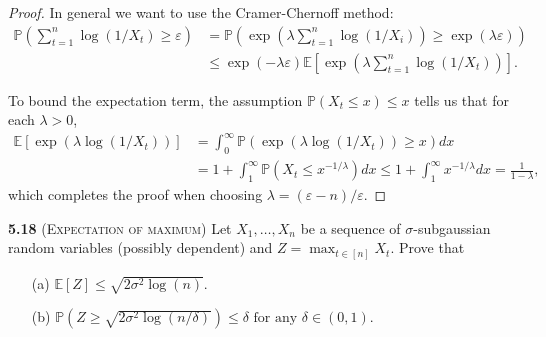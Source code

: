 \begin{proof}
	In general we want to use the Cramer-Chernoff method:
	\begin{equation*}
		\begin{aligned}
			\mathbb{P}\left(\sum_{t=1}^{n} \log \left(1 / X_{t}\right) \geq \varepsilon\right)
			&=\mathbb{P}\left(\exp \left(\lambda \sum_{t=1}^{n} \log \left(1 / X_{i}\right)\right) \geq \exp (\lambda \varepsilon)\right)\\
			&\leq \exp (-\lambda \varepsilon) \mathbb{E}\left[\exp \left(\lambda \sum_{t=1}^{n} \log \left(1 / X_{t}\right)\right)\right].
		\end{aligned}
	\end{equation*}

	To bound the expectation term, the assumption $\mathbb{P}\left(X_{t} \leq x\right) \leq x$ tells us that for each $\lambda > 0$,
	\begin{equation*}
		\begin{aligned}
			\mathbb{E}\left[\exp \left(\lambda \log \left(1 / X_{t}\right)\right)\right]
			&=\int_{0}^{\infty} \mathbb{P}\left(\exp \left(\lambda \log \left(1 / X_{t}\right)\right) \geq x\right) d x\\
			&=1+\int_{1}^{\infty} \mathbb{P}\left(X_{t} \leq x^{-1 / \lambda}\right) d x \leq 1+\int_{1}^{\infty} x^{-1 / \lambda} d x=\frac{1}{1-\lambda},
		\end{aligned}
	\end{equation*}
	which completes the proof when choosing $\lambda=(\varepsilon-n) / \varepsilon$.
\end{proof}








\noindent \textbf{5.18} (\textsc{Expectation of maximum})
Let $X_{1}, \ldots, X_{n}$ be a sequence of $\sigma$-subgaussian random variables
(possibly dependent) and $Z=\max _{t \in[n]} X_{t}$. Prove that

\begin{itemize}
	\item[(a)] $\mathbb{E}[Z] \leq \sqrt{2 \sigma^{2} \log (n)}$.
	\item[(b)] $\mathbb{P}\left(Z \geq \sqrt{2 \sigma^{2} \log (n / \delta)}\right) \leq \delta \text { for any } \delta \in(0,1)$.
\end{itemize}

